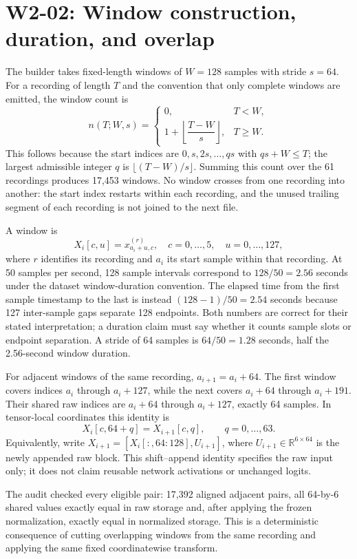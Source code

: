 \documentclass[11pt,a4paper]{article}
\newcommand{\R}{\mathbb R}\newcommand{\N}{\mathbb N}
\begin{document}
\section{W2-02: Window construction, duration, and overlap}
The builder takes fixed-length windows of $W=128$ samples with stride $s=64$. For a recording of length $T$ and the convention that only complete windows are emitted, the window count is
\[
 n(T;W,s)=\begin{cases}0,&T<W,\\1+\left\lfloor\dfrac{T-W}{s}\right\rfloor,&T\ge W.\end{cases}
\]
This follows because the start indices are $0,s,2s,\ldots,qs$ with $qs+W\le T$; the largest admissible integer $q$ is $\lfloor(T-W)/s\rfloor$. Summing this count over the 61 recordings produces 17,453 windows. No window crosses from one recording into another: the start index restarts within each recording, and the unused trailing segment of each recording is not joined to the next file.

A window is
\[
 X_i[c,u]=x^{(r)}_{a_i+u,c},\quad c=0,\ldots,5,\quad u=0,\ldots,127,
\]
where $r$ identifies its recording and $a_i$ its start sample within that recording. At 50 samples per second, 128 sample intervals correspond to $128/50=2.56$ seconds under the dataset window-duration convention. The elapsed time from the first sample timestamp to the last is instead $(128-1)/50=2.54$ seconds because 127 inter-sample gaps separate 128 endpoints. Both numbers are correct for their stated interpretation; a duration claim must say whether it counts sample slots or endpoint separation. A stride of 64 samples is $64/50=1.28$ seconds, half the 2.56-second window duration.

For adjacent windows of the same recording, $a_{i+1}=a_i+64$. The first window covers indices $a_i$ through $a_i+127$, while the next covers $a_i+64$ through $a_i+191$. Their shared raw indices are $a_i+64$ through $a_i+127$, exactly 64 samples. In tensor-local coordinates this identity is
\[
 X_i[c,64+q]=X_{i+1}[c,q],\qquad q=0,\ldots,63.
\]
Equivalently, write $X_{i+1}=[X_i[:,64:128],U_{i+1}]$, where $U_{i+1}\in\R^{6\times64}$ is the newly appended raw block. This shift--append identity specifies the raw input only; it does not claim reusable network activations or unchanged logits.

The audit checked every eligible pair: 17,392 aligned adjacent pairs, all 64-by-6 shared values exactly equal in raw storage and, after applying the frozen normalization, exactly equal in normalized storage. This is a deterministic consequence of cutting overlapping windows from the same recording and applying the same fixed coordinatewise transform.
\end{document}
